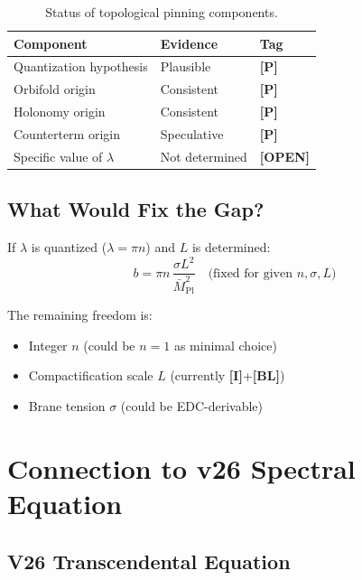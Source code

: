 \documentclass[11pt,a4paper]{article}
\newcommand{\Mpl}{\bar{M}_{\mathrm{Pl}}}
\newcommand{\tagI}{\textbf{[I]}}
\newcommand{\tagBL}{\textbf{[BL]}}
\newcommand{\tagP}{\textbf{[P]}}
\newcommand{\tagOPEN}{\textbf{[OPEN]}}
\theoremstyle{definition}
\theoremstyle{plain}
\theoremstyle{remark}
\begin{document}
\begin{table}[htbp]
\centering
\caption{Status of topological pinning components.}
\label{tab:pinning-status}
\begin{tabular}{@{}lll@{}}
\toprule
Component & Evidence & Tag \\
\midrule
Quantization hypothesis & Plausible & \tagP{} \\
Orbifold origin & Consistent & \tagP{} \\
Holonomy origin & Consistent & \tagP{} \\
Counterterm origin & Speculative & \tagP{} \\
Specific value of $\lambda$ & Not determined & \tagOPEN{} \\
\bottomrule
\end{tabular}
\end{table}

\subsection{What Would Fix the Gap?}

If $\lambda$ is quantized ($\lambda = \pi n$) and $L$ is determined:
\begin{equation}
b = \pi n \, \frac{\sigma L^2}{\Mpl^2} \quad \text{(fixed for given } n, \sigma, L\text{)}
\label{eq:b-fixed}
\end{equation}

The remaining freedom is:
\begin{itemize}
\item Integer $n$ (could be $n = 1$ as minimal choice)
\item Compactification scale $L$ (currently \tagI{}+\tagBL{})
\item Brane tension $\sigma$ (could be EDC-derivable)
\end{itemize}

\section{Connection to v26 Spectral Equation}
\label{sec:v26-connection}

\subsection{V26 Transcendental Equation}
\end{document}
